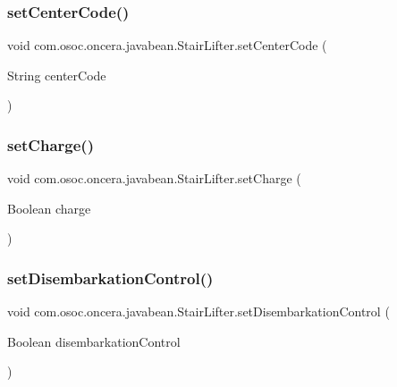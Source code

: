 \subsubsection{\texorpdfstring{setCenterCode()}{setCenterCode()}}
{\footnotesize\ttfamily void com.\+osoc.\+oncera.\+javabean.\+Stair\+Lifter.\+set\+Center\+Code (\begin{DoxyParamCaption}\item[{String}]{center\+Code }\end{DoxyParamCaption})}

\mbox{\label{classcom_1_1osoc_1_1oncera_1_1javabean_1_1_stair_lifter_a1a99579406a0f2eab28144daf4f370d0}} 
\subsubsection{\texorpdfstring{setCharge()}{setCharge()}}
{\footnotesize\ttfamily void com.\+osoc.\+oncera.\+javabean.\+Stair\+Lifter.\+set\+Charge (\begin{DoxyParamCaption}\item[{Boolean}]{charge }\end{DoxyParamCaption})}

\mbox{\label{classcom_1_1osoc_1_1oncera_1_1javabean_1_1_stair_lifter_a98a4eb9d607a49134bc8efd169f89f63}} 
\subsubsection{\texorpdfstring{setDisembarkationControl()}{setDisembarkationControl()}}
{\footnotesize\ttfamily void com.\+osoc.\+oncera.\+javabean.\+Stair\+Lifter.\+set\+Disembarkation\+Control (\begin{DoxyParamCaption}\item[{Boolean}]{disembarkation\+Control }\end{DoxyParamCaption})}

